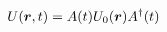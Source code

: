 \begin{equation}
U(\mbox{\boldmath$r$}, t)=A(t) U_0(\mbox{\boldmath$r$}) A^\dag(t)  \label{eq:u}
\end{equation}

